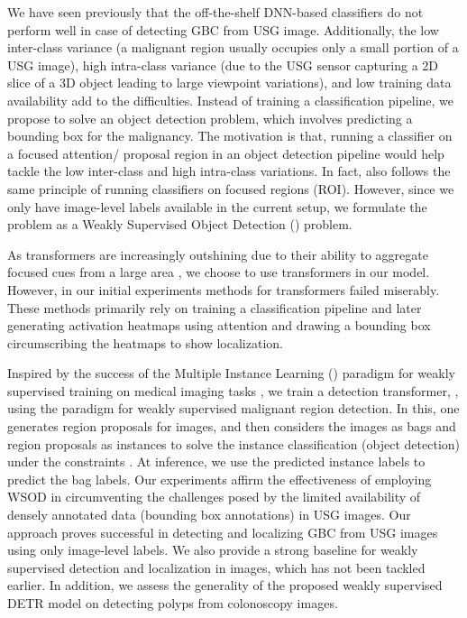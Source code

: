 We have seen previously that the off-the-shelf DNN-based classifiers do not perform well in case of detecting GBC from USG image. %
Additionally, the low inter-class variance (a malignant region usually occupies only a small portion of a USG image), high intra-class variance (due to the USG sensor capturing a 2D slice of a 3D object leading to large viewpoint variations), and low training data availability add to the difficulties. Instead of training a classification pipeline, we propose to solve an object detection problem, which involves predicting a bounding box for the malignancy. The motivation is that, running a classifier on a focused attention/ proposal region in an object detection pipeline would help tackle the low inter-class and high intra-class variations. In fact, \gbcnet also follows the same principle of running classifiers on focused regions (ROI). However, since we only have image-level labels available in the current setup, we formulate the problem as a Weakly Supervised Object Detection (\wsod) problem. 

As transformers are increasingly outshining \cnns due to their ability to aggregate focused cues from a large area \cite{vit,detr}, we choose to use transformers in our model. However, in our initial experiments \sota \wsod methods for transformers failed miserably. These methods primarily rely on training a classification pipeline and later generating activation heatmaps using attention and drawing a bounding box circumscribing the heatmaps \cite{tscam,scm} to show localization. %

Inspired by the success of the Multiple Instance Learning (\mil) paradigm for weakly supervised training on medical imaging tasks \cite{transmil,swinmil}, we train a detection transformer, \detr, using the \mil paradigm for weakly supervised malignant region detection. In this, one generates region proposals for images, and then considers the images as bags and region proposals as instances to solve the instance classification (object detection) under the \mil constraints \cite{dietterich1997solving}. At inference, we use the predicted instance labels to predict the bag labels. Our experiments affirm the effectiveness of employing WSOD in circumventing the challenges posed by the limited availability of densely annotated data (bounding box annotations) in USG images. Our approach proves successful in detecting and localizing GBC from USG images using only image-level labels. We also provide a strong baseline for weakly supervised \gbc detection and localization in \usg images, which has not been tackled earlier. In addition, we assess the generality of the proposed weakly supervised DETR model on detecting polyps from colonoscopy images.

